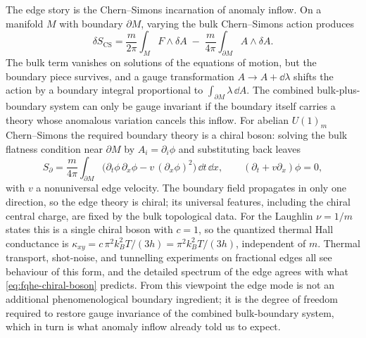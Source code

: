 The edge story is the Chern--Simons incarnation of anomaly inflow. On a manifold $M$ with boundary $\partial M$, varying the bulk Chern--Simons action produces
\begin{equation}
  \delta S_{\mathrm{CS}}
  =
  \frac{m}{2\pi}\int_{M}F\wedge\delta A
  \;-\;
  \frac{m}{4\pi}\int_{\partial M}A\wedge\delta A.
  \label{eq:fqhe-boundary-variation}
\end{equation}
The bulk term vanishes on solutions of the equations of motion, but the boundary piece survives, and a gauge transformation $A\to A+\dd\lambda$ shifts the action by a boundary integral proportional to $\int_{\partial M}\lambda\,\dd A$. The combined bulk-plus-boundary system can only be gauge invariant if the boundary itself carries a theory whose anomalous variation cancels this inflow. For abelian $U(1)_m$ Chern--Simons the required boundary theory is a chiral boson: solving the bulk flatness condition near $\partial M$ by $A_i = \partial_i\phi$ and substituting back leaves
\begin{equation}
  S_{\partial}
  =
  \frac{m}{4\pi}\int_{\partial M}
  \bigl(\partial_t\phi\,\partial_x\phi
  - v\,(\partial_x\phi)^2\bigr)\,\dd t\,\dd x,
  \qquad
  (\partial_t + v\partial_x)\phi = 0,
  \label{eq:fqhe-chiral-boson}
\end{equation}
with $v$ a nonuniversal edge velocity. The boundary field propagates in only one direction, so the edge theory is chiral; its universal features, including the chiral central charge, are fixed by the bulk topological data. For the Laughlin $\nu=1/m$ states this is a single chiral boson with $c=1$, so the quantized thermal Hall conductance is $\kappa_{xy} = c\,\pi^{2}k_{B}^{2}T/(3h) = \pi^{2}k_{B}^{2}T/(3h)$, independent of $m$. Thermal transport, shot-noise, and tunnelling experiments on fractional edges all see behaviour of this form, and the detailed spectrum of the edge agrees with what \eqref{eq:fqhe-chiral-boson} predicts. From this viewpoint the edge mode is not an additional phenomenological boundary ingredient; it is the degree of freedom required to restore gauge invariance of the combined bulk-boundary system, which in turn is what anomaly inflow already told us to expect.

